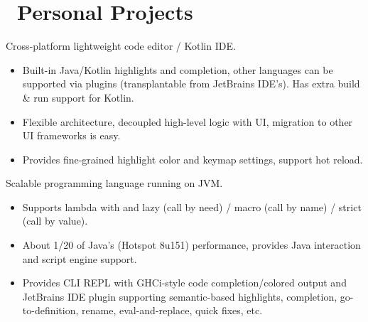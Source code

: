 \documentclass{resume}
\begin{document}
\section{\faGithubAlt\ Personal Projects}
Cross-platform lightweight code editor / Kotlin IDE.
\begin{itemize}
  \item Built-in Java/Kotlin highlights and completion, other languages can be supported via plugins (transplantable from JetBrains IDE's).
    Has extra build \& run support for Kotlin.
  \item Flexible architecture, decoupled high-level logic with UI, migration to other UI frameworks is easy.
  \item Provides fine-grained highlight color and keymap settings, support hot reload.
\end{itemize}

Scalable programming language running on JVM.
\begin{itemize}
  \item Supports lambda with and lazy (call by need) / macro (call by name) / strict (call by value).
  \item About 1/20 of Java's (Hotspot 8u151) performance, provides Java interaction and script engine support.
  \item Provides CLI REPL with GHCi-style code completion/colored output and JetBrains IDE plugin supporting semantic-based highlights, completion, go-to-definition, rename, eval-and-replace, quick fixes, etc.
\end{itemize}
\end{document}
